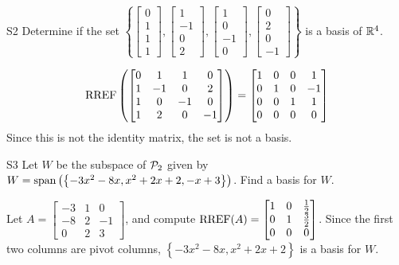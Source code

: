 \documentclass{sbgLAexam}
\begin{document}
\begin{problem}{S2}
Determine if the set $\left\{ \begin{bmatrix} 0 \\ 1 \\ 1 \\ 1 \end{bmatrix}, \begin{bmatrix} 1 \\ -1 \\ 0 \\ 2 \end{bmatrix}, \begin{bmatrix} 1 \\ 0 \\ -1 \\ 0 \end{bmatrix}, \begin{bmatrix}0 \\ 2 \\ 0 \\ -1 \end{bmatrix} \right\}$ is a basis of $\IR^4$.
\end{problem}
\begin{solution}
$$\RREF\left(\begin{bmatrix} 0 & 1 & 1 & 0 \\ 1 & -1 & 0 & 2   \\ 1 & 0 & -1 & 0  \\ 1 & 2 & 0 & -1  \end{bmatrix} \right) = \begin{bmatrix} 1 & 0 & 0 & 1  \\ 0 & 1 & 0 & -1  \\ 0 & 0 & 1 & 1  \\ 0 & 0 & 0 & 0 \end{bmatrix} $$
Since this is not the identity matrix, the set is not a basis.
\end{solution}
\begin{extract}\newpage\end{extract}
\begin{problem}{S3}
Let $W$ be the subspace of $\P_2$ given by $W = {\rm span} \left( \left\{  -3x^2-8x, x^2+2x+2, -x+3\right\} \right)$.   Find a basis for $W$.
\end{problem}
\begin{solution}
Let $A= \begin{bmatrix}-3 & 1 & 0 \\ -8 & 2 & -1 \\ 0 & 2 & 3\end{bmatrix}$, and compute $\RREF(A) = \begin{bmatrix} 1 & 0 & \frac{1}{2} \\ 0 & 1 & \frac{3}{2} \\ 0 & 0 & 0 \end{bmatrix}$.
Since the first two columns are pivot columns, $\left\{ -3x^2-8x, x^2+2x+2\right\} $ is a basis for $W$.
\end{solution}
\end{document}
